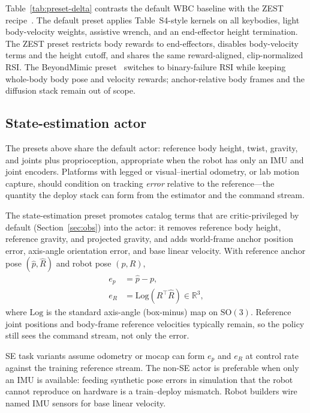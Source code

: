 \documentclass[11pt,a4paper]{article}
\begin{document}
Table~\ref{tab:preset-delta} contrasts the default WBC baseline with the ZEST
recipe~\citep{zest2026}. The default preset applies Table~S4-style kernels on all
keybodies, light body-velocity weights, assistive wrench, and an end-effector
height termination. The ZEST preset restricts body rewards to end-effectors,
disables body-velocity terms and the height cutoff, and shares the same
reward-aligned, clip-normalized RSI. The BeyondMimic preset~\citep{liao2025beyondmimic}
switches to binary-failure RSI while keeping whole-body body pose and velocity
rewards; anchor-relative body frames and the diffusion stack remain out of scope.

\subsection{State-estimation actor}
\label{sec:se}
The presets above share the default actor: reference body height, twist,
gravity, and joints plus proprioception, appropriate when the robot has only an
IMU and joint encoders.
Platforms with legged or visual--inertial odometry, or lab motion capture,
should condition on tracking \emph{error} relative to the reference---the
quantity the deploy stack can form from the estimator and the command stream.

The state-estimation preset promotes catalog terms that are critic-privileged by
default (Section~\ref{sec:obs}) into the actor: it removes reference body height,
reference gravity, and projected gravity, and adds world-frame anchor position
error, axis-angle orientation error, and base linear velocity. With reference
anchor pose $(\hat p,\hat R)$ and robot pose $(p,R)$,
\begin{align}
  e_p &= \hat p - p, \\
  e_R &= \mathrm{Log}(R^{\top}\hat R)\in\mathbb{R}^3,
\end{align}
where $\mathrm{Log}$ is the standard axis-angle (box-minus) map on
$\mathrm{SO}(3)$. Reference joint positions and body-frame reference velocities
typically remain, so the policy still sees the command stream, not only the error.

SE task variants assume odometry or mocap can form $e_p$ and $e_R$ at control
rate against the training reference stream. The non-SE actor is preferable when
only an IMU is available: feeding synthetic pose errors in simulation that the
robot cannot reproduce on hardware is a train--deploy mismatch. Robot builders
wire named IMU sensors for base linear velocity.
\end{document}
